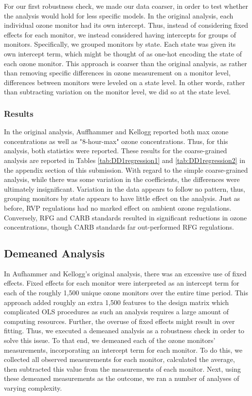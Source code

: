 \documentclass{article}
\begin{document}
For our first robustness check, we made our data coarser, in order to test whether the analysis would hold for less specific models. In the original analysis, each individual ozone monitor had its own intercept. Thus, instead of considering fixed effects for each monitor, we instead considered having intercepts for groups of monitors. Specifically, we grouped monitors by state. Each state was given its own intercept term, which might be thought of as one-hot encoding the state of each ozone monitor. This approach is coarser than the original analysis, as rather than removing specific differences in ozone measurement on a monitor level, differences between monitors were leveled on a state level. In other words, rather than subtracting variation on the monitor level, we did so at the state level.

\subsubsection{Results}

In the original analysis, Auffhammer and Kellogg reported both max ozone concentrations as well as "8-hour-max" ozone concentrations. Thus, for this analysis, both statistics were reported. These results for the coarse-grained analysis are reported in Tables \ref{tab:DD1regression1} and \ref{tab:DD1regression2}  in the appendix section of this submission. With regard to the simple coarse-grained analysis, while there was some variation in the coefficients, the differences were ultimately insignificant. Variation in the data appears to follow no pattern, thus, grouping monitors by state appears to have little effect on the analysis. Just as before, RVP regulations had no marked effect on ambient ozone regulations. Conversely, RFG and CARB standards resulted in significant reductions in ozone concentrations, though CARB standards far out-performed RFG regulations. 
 

\subsection{Demeaned Analysis}

In Aufhammer and Kellogg's original analysis, there was an excessive use of fixed effects. Fixed effects for each monitor were interpreted as an intercept term for each of the roughly 1,500 unique ozone monitors over the entire time period. This approach added roughly an extra 1,500 features to the design matrix which complicated OLS procedures as such an analysis requires a large amount of computing resources. Further, the overuse of fixed effects might result in over fitting. Thus, we executed a demeaned analysis as a robustness check in order to solve this issue. To that end, we demeaned each of the ozone monitors' measurements, incorporating an intercept term for each monitor. To do this, we collected all observed measurements for each monitor, calculated the average, then subtracted this value from the measurements of each monitor. Next, using these demeaned measurements as the outcome, we ran a number of analyses of varying complexity.
\end{document}

